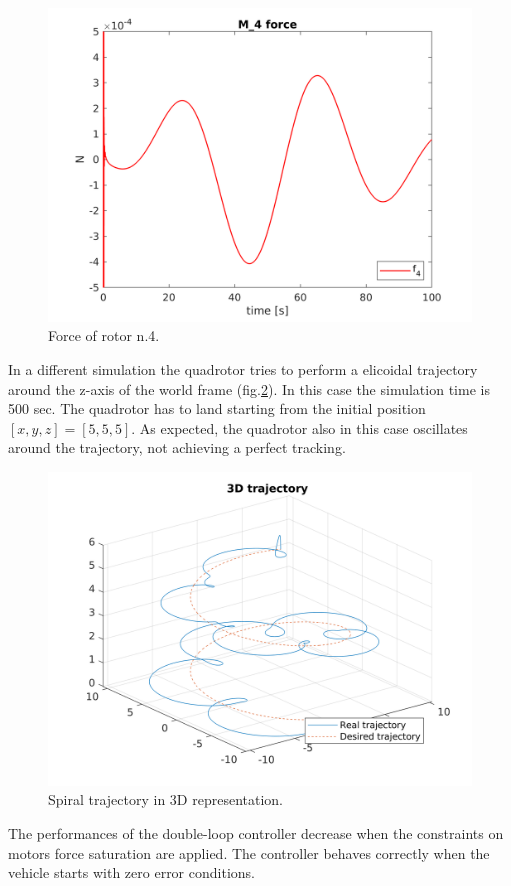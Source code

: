 \documentclass[11pt,a4paper]{scrartcl}
\begin{document}
\begin{figure}
	\centering
	\includegraphics[width=0.7\linewidth]{Images/r4force}
	\caption{Force of rotor n.4.}
	\label{fig:r4force}
\end{figure}

\newpage

In a different simulation the quadrotor tries to perform a elicoidal trajectory around the z-axis of the world frame (fig.\ref{fig:3dpositionspiral}). In this case the simulation time is 500 sec. The quadrotor has to land starting from the initial position $ [x, y, z] = [5, 5, 5] $. As expected, the quadrotor also in this case oscillates around the trajectory, not achieving a perfect tracking.

\begin{figure}[H]
	\centering
	\includegraphics[width=0.7\linewidth]{Images/3dPosition_spiral}
	\caption{Spiral trajectory in 3D representation.}
	\label{fig:3dpositionspiral}
\end{figure}

The performances of the double-loop controller decrease when the constraints on motors force saturation are applied. The controller behaves correctly when the vehicle starts with zero error conditions. 
\end{document}
